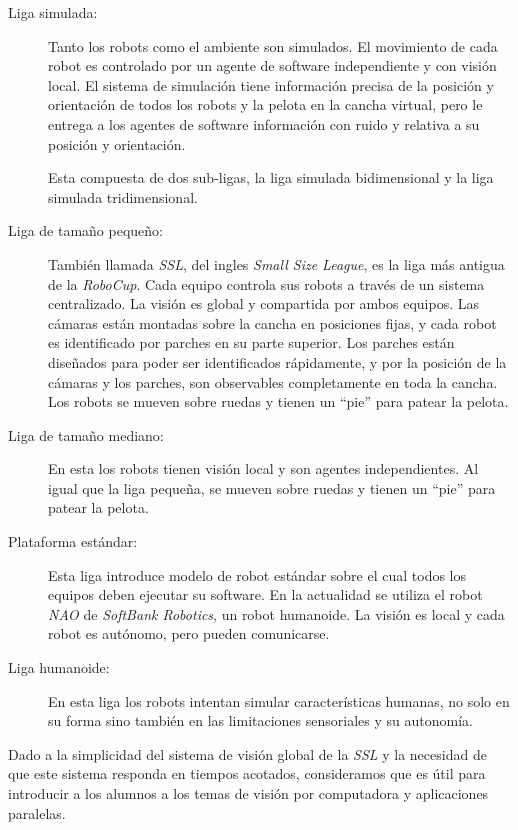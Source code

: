 \begin{description}

	\item[Liga simulada:] Tanto los robots como el ambiente son simulados.
		El movimiento de cada robot es controlado por un agente de
		software independiente y con visión local. El sistema de
		simulación tiene información precisa de la posición y
		orientación de todos los robots y la pelota en la cancha
		virtual, pero le entrega a los agentes de software información
		con ruido y relativa a su posición y orientación.

		Esta compuesta de dos sub-ligas, la liga simulada
		bidimensional y la liga simulada tridimensional.

	\item[Liga de tamaño pequeño:] También llamada \emph{SSL}, del ingles
		\emph{Small Size League}, es la liga más antigua de la
		\emph{RoboCup}. Cada equipo controla sus robots a través de un
		sistema centralizado. La visión es global y compartida por ambos
		equipos. Las cámaras están montadas sobre la cancha en
		posiciones fijas, y cada robot es identificado por parches en su
		parte superior. Los parches están diseñados para poder ser
		identificados rápidamente, y por la posición de la cámaras y los
		parches, son observables completamente en toda la cancha. Los
		robots se mueven sobre ruedas y tienen un ``pie'' para patear la
		pelota.

	\item[Liga de tamaño mediano:] En esta los robots tienen visión local
		y son agentes independientes. Al igual que la liga pequeña, se
		mueven sobre ruedas y tienen un ``pie'' para patear la pelota.

	\item[Plataforma estándar:] Esta liga introduce modelo de robot
		estándar sobre el cual todos los equipos deben ejecutar su
		software. En la actualidad se utiliza el robot \emph{NAO} de
		\emph{SoftBank Robotics}, un robot humanoide. La visión es
		local y cada robot es autónomo, pero pueden comunicarse.

	\item[Liga humanoide:] En esta liga los robots intentan simular
		características humanas, no solo en su forma sino también en
		las limitaciones sensoriales y su autonomía.

\end{description}

Dado a la simplicidad del sistema de visión global de la \emph{SSL} y la
necesidad de que este sistema responda en tiempos acotados, consideramos que es
útil para introducir a los alumnos a los temas de visión por computadora y
aplicaciones paralelas.


